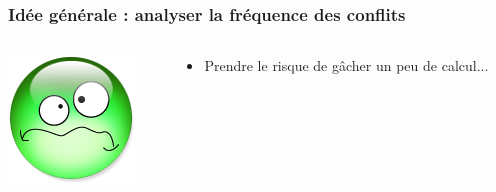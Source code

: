 \documentclass[xcolor={x11names,svgnames}]{beamer}
\begin{document}

\begin{frame}[label=idea1]
  \frametitle{Idée générale : \textbf{analyser la fréquence des conflits}}

  \begin{columns}[c]
    \begin{column}{.1\textwidth}
      \vspace{1mm}
      \includegraphics[width=\textwidth]{triste.png}
    \end{column}
    
    \begin{column}{.9\textwidth}
      \begin{itemize}
      \item Prendre le risque de gâcher un peu de calcul...
      \end{itemize}
    \end{column}
  \end{columns}

  \vspace{1cm}
  

\end{frame}
\end{document}

